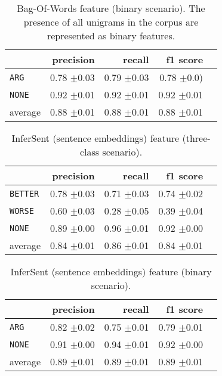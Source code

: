 	
	\begin{table}[htbp] 
		\centering 
		\caption{Bag-Of-Words feature (binary scenario). The presence of all unigrams in the corpus are represented as binary features.} 

		\begin{tabular}{@{}lrrrr@{}}
			\toprule
			        & precision                & recall                   & f1 score                 \\ \midrule 
	\texttt{ARG}	&	 0.78 \scriptsize{$\pm$0.03} &	 0.79 \scriptsize{$\pm$0.03} &	 0.78 \scriptsize{$\pm$0.0)}  \\ 
	\texttt{NONE}	&	 0.92 \scriptsize{$\pm$0.01} &	 0.92 \scriptsize{$\pm$0.01} &	 0.92 \scriptsize{$\pm$0.01}  \\ 
average	&	 0.88 \scriptsize{$\pm$0.01} &	 0.88 \scriptsize{$\pm$0.01} &	 0.88 \scriptsize{$\pm$0.01}  \\ 
			\bottomrule
		\end{tabular}
	\end{table}
	
	
	\begin{table}[htbp] 
		\centering 
		\caption{InferSent (sentence embeddings) feature (three-class scenario).} 

		\begin{tabular}{@{}lrrrr@{}}
			\toprule
			        & precision                & recall                   & f1 score                 \\ \midrule 
\texttt	{BETTER}	&	 0.78 \scriptsize{$\pm$0.03} &	 0.71 \scriptsize{$\pm$0.03} &	 0.74 \scriptsize{$\pm$0.02}  \\ 
\texttt	{WORSE}	&	 0.60 \scriptsize{$\pm$0.03} &	 0.28 \scriptsize{$\pm$0.05} &	 0.39 \scriptsize{$\pm$0.04}  \\ 
\texttt	{NONE}	&	 0.89 \scriptsize{$\pm$0.00} &	 0.96 \scriptsize{$\pm$0.01} &	 0.92 \scriptsize{$\pm$0.00}  \\ 
average	&	 0.84 \scriptsize{$\pm$0.01} &	 0.86 \scriptsize{$\pm$0.01} &	 0.84 \scriptsize{$\pm$0.01}  \\ 
			\bottomrule
		\end{tabular}
	\end{table}
	
	\begin{table}[htbp] 
		\centering 
		\caption{InferSent (sentence embeddings) feature (binary scenario).} 
		\label{  }
		\begin{tabular}{@{}lrrrr@{}}
			\toprule
			        & precision                & recall                   & f1 score                 \\ \midrule 
			\texttt{ARG}	&	 0.82 \scriptsize{$\pm$0.02} &	 0.75 \scriptsize{$\pm$0.01} &	 0.79 \scriptsize{$\pm$0.01}  \\ 
	\texttt{NONE}	&	 0.91 \scriptsize{$\pm$0.00} &	 0.94 \scriptsize{$\pm$0.01} &	 0.92 \scriptsize{$\pm$0.00}  \\ 
average	&	 0.89 \scriptsize{$\pm$0.01} &	 0.89 \scriptsize{$\pm$0.01} &	 0.89 \scriptsize{$\pm$0.01}  \\ 
			\bottomrule
		\end{tabular}
	\end{table}
	
